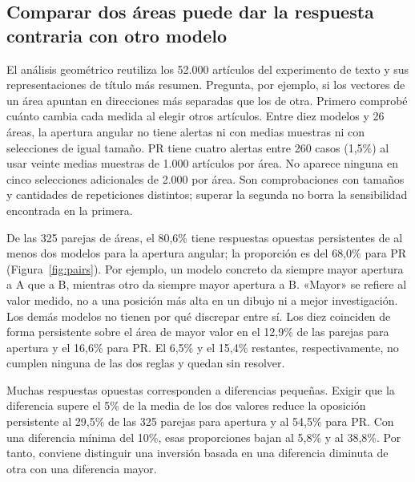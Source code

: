 \documentclass[12pt]{article}
\begin{document}
\subsection{Comparar dos áreas puede dar la respuesta contraria con otro modelo}
El análisis geométrico reutiliza los 52.000 artículos del experimento de texto y sus representaciones de título más resumen. Pregunta, por ejemplo, si los vectores de un área apuntan en direcciones más separadas que los de otra. Primero comprobé cuánto cambia cada medida al elegir otros artículos. Entre diez modelos y 26 áreas, la apertura angular no tiene alertas ni con medias muestras ni con selecciones de igual tamaño. PR tiene cuatro alertas entre 260 casos (1,5\%) al usar veinte medias muestras de 1.000 artículos por área. No aparece ninguna en cinco selecciones adicionales de 2.000 por área. Son comprobaciones con tamaños y cantidades de repeticiones distintos; superar la segunda no borra la sensibilidad encontrada en la primera.

De las 325 parejas de áreas, el 80,6\% tiene respuestas opuestas persistentes de al menos dos modelos para la apertura angular; la proporción es del 68,0\% para PR (Figura~\ref{fig:pairs}). Por ejemplo, un modelo concreto da siempre mayor apertura a A que a B, mientras otro da siempre mayor apertura a B. «Mayor» se refiere al valor medido, no a una posición más alta en un dibujo ni a mejor investigación. Los demás modelos no tienen por qué discrepar entre sí. Los diez coinciden de forma persistente sobre el área de mayor valor en el 12,9\% de las parejas para apertura y el 16,6\% para PR. El 6,5\% y el 15,4\% restantes, respectivamente, no cumplen ninguna de las dos reglas y quedan sin resolver.

Muchas respuestas opuestas corresponden a diferencias pequeñas. Exigir que la diferencia supere el 5\% de la media de los dos valores reduce la oposición persistente al 29,5\% de las 325 parejas para apertura y al 54,5\% para PR. Con una diferencia mínima del 10\%, esas proporciones bajan al 5,8\% y al 38,8\%. Por tanto, conviene distinguir una inversión basada en una diferencia diminuta de otra con una diferencia mayor.
\end{document}

